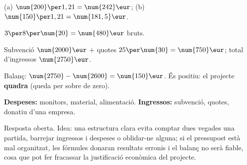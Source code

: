 \begin{solucions}
\begin{sollist}
  \item (a) $\num{200}\per 1,21=\num{242}\eur$; \quad (b) $\num{150}\per 1,21=\num{181,5}\eur$.
  \item $3\per 8\per\num{20}=\num{480}\eur$ bruts.
  \item Subvenció $\num{2000}\eur$ $+$ quotes $25\per\num{30}=\num{750}\eur$; total
        d'ingressos $\num{2750}\eur$.
  \item Balanç: $\num{2750}-\num{2600}=\num{150}\eur$. És positiu: el projecte
        \textbf{quadra} (queda per sobre de zero).
  \item \textbf{Despeses:} monitors, material, alimentació. \textbf{Ingressos:}
        subvenció, quotes, donatiu d'una empresa.
  \item Resposta oberta. Idea: una estructura clara evita comptar dues vegades una
        partida, barrejar ingressos i despeses o oblidar-ne alguna; si el pressupost
        està mal organitzat, les fórmules donaran resultats erronis i el balanç no serà
        fiable, cosa que pot fer fracassar la justificació econòmica del projecte.
\end{sollist}
\end{solucions}
